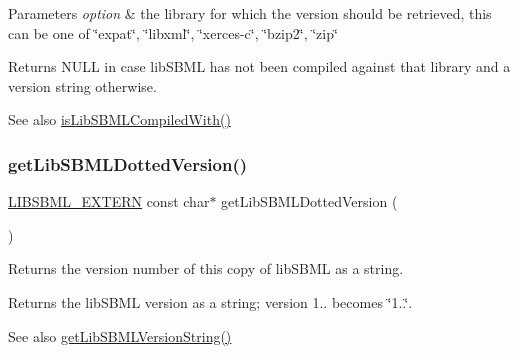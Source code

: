 \begin{DoxyParams}{Parameters}
{\em option} & the library for which the version should be retrieved, this can be one of \char`\"{}expat\char`\"{}, \char`\"{}libxml\char`\"{}, \char`\"{}xerces-\/c\char`\"{}, \char`\"{}bzip2\char`\"{}, \char`\"{}zip\char`\"{}\\
\hline
\end{DoxyParams}
\begin{DoxyReturn}{Returns}
N\+U\+LL in case lib\+S\+B\+ML has not been compiled against that library and a version string otherwise.
\end{DoxyReturn}
\begin{DoxySeeAlso}{See also}
\hyperlink{libsbml-version_8h_a80617f7a0adabd2633507992b265ae6e}{is\+Lib\+S\+B\+M\+L\+Compiled\+With()} 
\end{DoxySeeAlso}
\mbox{\label{libsbml-version_8h_a3c6ac0bb047165d2c7f26ff94628eb8f}} 
\subsubsection{\texorpdfstring{get\+Lib\+S\+B\+M\+L\+Dotted\+Version()}{getLibSBMLDottedVersion()}}
{\footnotesize\ttfamily \hyperlink{extern_8h_a8e9e5118f0c55d410f8bc217f2954dbf}{L\+I\+B\+S\+B\+M\+L\+\_\+\+E\+X\+T\+E\+RN} const char$\ast$ get\+Lib\+S\+B\+M\+L\+Dotted\+Version (\begin{DoxyParamCaption}{ }\end{DoxyParamCaption})}

Returns the version number of this copy of lib\+S\+B\+ML as a string.

\begin{DoxyReturn}{Returns}
the lib\+S\+B\+ML version as a string; version 1.. becomes \char`\"{}1..\char`\"{}.
\end{DoxyReturn}
\begin{DoxySeeAlso}{See also}
\hyperlink{libsbml-version_8h_afb7a81ac82570cba7b612c5f0a02c107}{get\+Lib\+S\+B\+M\+L\+Version\+String()} 
\end{DoxySeeAlso}
\mbox{\label{libsbml-version_8h_af9ca9c7cc855f3281c500df8cc48886b}} 
